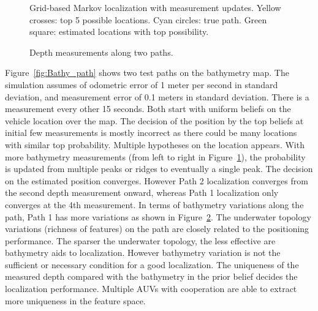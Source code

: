 \begin{figure}[htbp]
\centering
{}
\caption{Grid-based Markov localization with measurement updates. Yellow crosses: top 5 possible locations. Cyan circles: true path. Green square: estimated locations with top possibility.}
              \label{fig:all}
\end{figure}

\begin{figure}[htbp]
\begin{center}
\caption{Depth measurements along two paths.}
              \label{fig:depth}
\end{center}
\end{figure}

Figure~\ref{fig:Bathy_path} shows two test paths on the bathymetry map. The simulation assumes of odometric error of 1 meter per second in standard deviation, and measurement error of 0.1 meters in standard deviation. There is a measurement every other 15 seconds. Both start with uniform beliefs on the vehicle location over the map. The decision of the position by the top beliefs at initial few measurements is mostly incorrect as there could be many locations with similar top probability. Multiple hypotheses on the location appears. With more bathymetry measurements (from left to right in Figure~\ref{fig:all}), the probability is updated from multiple peaks or ridges to eventually a single peak. The decision on the estimated position converges. However Path 2 localization converges from the second depth measurement onward, whereas Path 1 localization only converges at the 4th measurement. In terms of bathymetry variations along the path, Path 1 has more variations as shown in Figure~\ref{fig:depth}. The underwater topology variations (richness of features) on the path are closely related to the positioning performance. The sparser the underwater topology, the less effective are bathymetry aids to localization. However bathymetry variation is not the sufficient or necessary condition for a good localization. The uniqueness of the measured depth compared with the bathymetry in the prior belief decides the localization performance. Multiple AUVs with cooperation are able to extract more uniqueness in the feature space.

